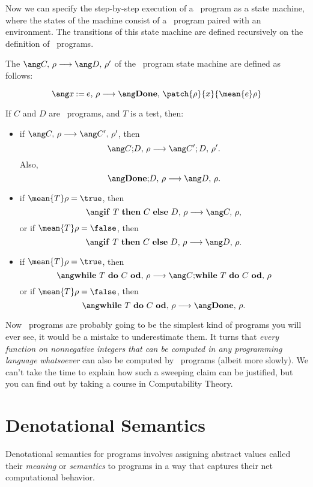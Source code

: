 Now we can specify the step-by-step execution of a \while\ program as a state
machine, where the states of the machine consist of a \while\ program paired with an
environment.  The transitions of this state machine are defined
recursively on the definition of \while\ programs.

\begin{definition}
The  $\step{C}{\rho}{D}{\rho'}$ of the \while\ program state
machine are defined as follows:

\[
\step{x \assigned e}{\rho}{\halt}{\patch{\rho}{x}{\mean{e}\rho}}
\]

If $C$ and $D$ are \while\ programs, and $T$ is a test, then:

\begin{itemize}

\item if $\step{C}{\rho}{C'}{\rho'}$, then
\[
\step{\seqcomm{C}{D}}{\rho}{C';D}{\rho'}.
\]
Also,
\[
\step{\seqcomm{\halt}{D}}{\rho}{D}{\rho}.
\]

\item if $\mean{T}\rho = \true$, then
\[
\step{\condcomm{T}{C}{D}}{\rho}{C}{\rho},
\]
or if $\mean{T}\rho = \false$, then
\[
\step{\condcomm{T}{C}{D}}{\rho}{D}{\rho}.
\]

\item if $\mean{T}\rho = \true$, then
\[
\step{\wloop{T}{C}}{\rho}{\seqcomm{C}{\wloop{T}{C}}}{\rho}
\]
or if $\mean{T}\rho = \false$, then
\[
\step{\wloop{T}{C}}{\rho}{\halt}{\rho}.
\]
\end{itemize}
\end{definition}

Now \while\ programs are probably going to be the simplest kind of programs you
will ever see, it would be a mistake to underestimate them.  It turns
that \emph{every function on nonnegative integers that can be computed in any
programming language whatsoever} can also be computed by \while\ programs
(albeit more slowly).  We can't take the time to explain how such a sweeping
claim can be justified, but you can find out by taking a course in Computability
Theory. %

\section{Denotational Semantics}

Denotational semantics for programs involves assigning abstract values
called their \emph{meaning} or \emph{semantics} to programs in a way
that captures their net computational behavior.


